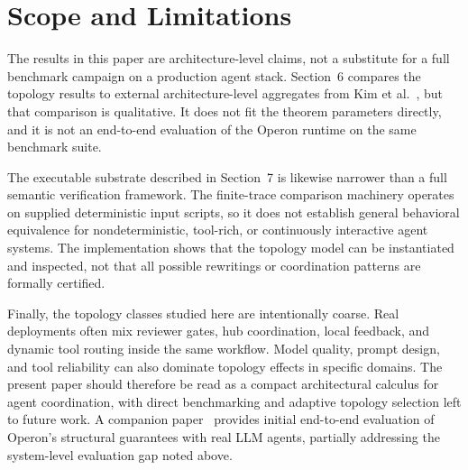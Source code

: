 \section{Scope and Limitations}

The results in this paper are architecture-level claims, not a substitute for a full benchmark campaign
on a production agent stack. Section~6 compares the topology results to external architecture-level
aggregates from Kim et al.~\cite{kim2025scaling}, but that comparison is qualitative. It does not fit the
theorem parameters directly, and it is not an end-to-end evaluation of the Operon runtime on the same
benchmark suite.

The executable substrate described in Section~7 is likewise narrower than a full semantic verification
framework. The finite-trace comparison machinery operates on supplied deterministic input scripts, so it
does not establish general behavioral equivalence for nondeterministic, tool-rich, or continuously
interactive agent systems. The implementation shows that the topology model can be instantiated and
inspected, not that all possible rewritings or coordination patterns are formally certified.

Finally, the topology classes studied here are intentionally coarse. Real deployments often mix reviewer
gates, hub coordination, local feedback, and dynamic tool routing inside the same workflow. Model quality,
prompt design, and tool reliability can also dominate topology effects in specific domains. The present
paper should therefore be read as a compact architectural calculus for agent coordination, with direct
benchmarking and adaptive topology selection left to future work.  A companion paper~\cite{banu2026benchmarks}
provides initial end-to-end evaluation of Operon's structural guarantees with real LLM agents, partially
addressing the system-level evaluation gap noted above.
